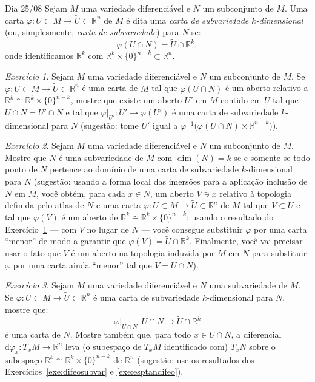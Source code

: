 \documentclass[oneside,11pt]{amsart}
\newcommand{\R}{\mathds R}
\newcommand{\dd}{\mathrm d}
\DeclareMathOperator{\Dim}{dim}
\theoremstyle{remark}\newtheorem{exercise}{Exercício}[section]
\theoremstyle{plain}\newtheorem{teo}{Teorema}[section]
\theoremstyle{plain}\newtheorem{lem}[teo]{Lema}
\theoremstyle{plain}\newtheorem{prop}[teo]{Proposição}
\theoremstyle{definition}\newtheorem{defin}[teo]{Definição}
\theoremstyle{remark}\newtheorem{rem}[teo]{Observação}
\theoremstyle{definition}\newtheorem{example}[teo]{Exemplo}
\numberwithin{equation}{section}
\begin{document}
\begin{section}{Dia 25/08}
Sejam $M$ uma variedade diferenciável e $N$ um subconjunto de $M$. Uma carta $\varphi:U\subset M\to\widetilde U\subset\R^n$
de $M$ é dita uma {\em carta de subvariedade $k$-dimensional\/} (ou, simplesmente, {\em carta de subvariedade})
para $N$ se:
\[\varphi(U\cap N)=\widetilde U\cap\R^k,\]
onde identificamos $\R^k$ com $\R^k\times\{0\}^{n-k}\subset\R^n$.
\begin{exercise}\label{exe:quasecartasubvar}
Sejam $M$ uma variedade diferenciável e $N$ um subconjunto de $M$. Se $\varphi:U\subset M\to\widetilde U\subset\R^n$
é uma carta de $M$ tal que $\varphi(U\cap N)$ é um aberto relativo a $\R^k\cong\R^k\times\{0\}^{n-k}$, mostre que
existe um aberto $U'$ em $M$ contido em $U$ tal que $U\cap N=U'\cap N$ e tal que $\varphi\vert_{U'}:U'\to\varphi(U')$
é uma carta de subvariedade $k$-dimensional para $N$ (sugestão: tome $U'$ igual a
$\varphi^{-1}\big(\varphi(U\cap N)\times\R^{n-k}\big)$).
\end{exercise}

\begin{exercise}
Sejam $M$ uma variedade diferenciável e $N$ um subconjunto de $M$. Mostre que $N$ é uma subvariedade de $M$ com $\Dim(N)=k$
se e somente se todo ponto de $N$ pertence ao domínio de uma carta de subvariedade $k$-dimensional para $N$ (sugestão: usando a forma local
das imersões para a aplicação inclusão de $N$ em $M$, você obtém, para cada $x\in N$, um aberto $V\ni x$ relativo à topologia definida pelo atlas de $N$ e
uma carta $\varphi:U\subset M\to\widetilde U\subset\R^n$ de $M$ tal que $V\subset U$ e tal que $\varphi(V)$ é um aberto de $\R^k\cong\R^k\times\{0\}^{n-k}$;
usando o resultado do Exercício~\ref{exe:quasecartasubvar} --- com $V$ no lugar de $N$ --- você consegue substituir $\varphi$ por uma carta ``menor'' de modo a garantir
que $\varphi(V)=\widetilde U\cap\R^k$. Finalmente, você vai precisar usar o fato que $V$ é um aberto na topologia induzida por $M$ em $N$ para
substituir $\varphi$ por uma carta ainda ``menor'' tal que $V=U\cap N$).
\end{exercise}

\begin{exercise}
Sejam $M$ uma variedade diferenciável e $N$ uma subvariedade de $M$. Se $\varphi:U\subset M\to\widetilde U\subset\R^n$ é uma carta de subvariedade
$k$-dimensional para $N$, mostre que:
\[\varphi\vert_{U\cap N}:U\cap N\longrightarrow\widetilde U\cap\R^k\]
é uma carta de $N$. Mostre também que, para todo $x\in U\cap N$, a diferencial $\dd\varphi_x:T_xM\to\R^n$ leva (o subespaço de $T_xM$ identificado com) $T_xN$
sobre o subespaço $\R^k\cong\R^k\times\{0\}^{n-k}$ de $\R^n$ (sugestão: use os resultados dos Exercícios~\ref{exe:difeosubvar} e \ref{exe:esptandifeo}).
\end{exercise}


\end{section}
\end{document}

